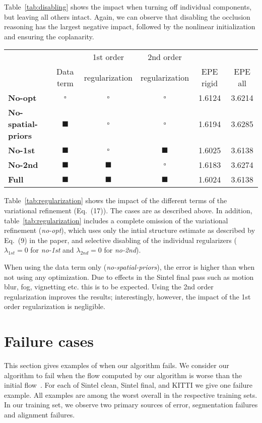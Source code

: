 \documentclass[10pt,twocolumn,letterpaper]{article}
\begin{document}
Table~\ref{tab:disabling} shows the impact when turning off individual components, but leaving all others intact.
Again, we can observe that disabling the occlusion reasoning has the largest negative impact, followed by the nonlinear initialization and ensuring the coplanarity.


\begin{table*}[h!]
\centering
\begin{tabular}{lccccc}
\toprule
& & 1st order & 2nd order & & \\
& Data term & regularization & regularization & EPE rigid & EPE all \\
\midrule
\textbf{No-opt} & $\square$ & $\square$ & $\square$ & 1.6124 & 3.6214 \\
\textbf{No-spatial-priors} & $\blacksquare$ & $\square$ & $\square$ & 1.6194 & 3.6285 \\
\textbf{No-1st} & $\blacksquare$ & $\square$ & $\blacksquare$ & 1.6025 & 3.6138 \\
\textbf{No-2nd} & $\blacksquare$ & $\blacksquare$ & $\square$ & 1.6183 & 3.6274 \\
\textbf{Full} & $\blacksquare$ & $\blacksquare$ & $\blacksquare$ & 1.6024 & 3.6138 \\
\bottomrule
\end{tabular}
\caption{Influence of regularization terms}
\label{tab:regularization}
\end{table*}

Table~\ref{tab:regularization} shows the impact of the different terms of the variational refinement (Eq.~(17)).
The cases are as described above.
In addition, table~\ref{tab:regularization} includes a complete omission of the variational refinement (\textit{no-opt}), which uses only the intial structure estimate as described by Eq.~(9) in the paper, and selective disabling of the individual regularizers ($\lambda_{1st}=0$ for \textit{no-1st} and $\lambda_{2nd}=0$ for \textit{no-2nd}).

When using the data term only (\textit{no-spatial-priors}), the error is higher than when not using any optimization.
Due to effects in the Sintel final pass such as motion blur, fog, vignetting etc. this is to be expected.
Using the 2nd order regularization improves the results; interestingly, however, the impact of the 1st order regularization is negligible.




 \section{Failure cases}
\newcommand{\failurewidth}{0.3\textwidth}
This section gives examples of when our algorithm fails.
We consider our algorithm to fail when the flow computed by our algorithm is worse than the initial flow~\cite{Menze2015GCPR}.
For each of Sintel clean, Sintel final, and KITTI we give one failure example.
All examples are among the worst overall in the respective training sets.
In our training set, we observe two primary sources of error, segmentation failures and alignment failures.
\end{document}
